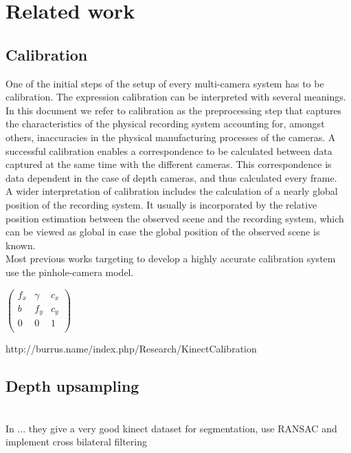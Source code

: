 \documentclass{ucl_thesis}
\begin{document}
\chapter{Related work} 
\label{chp:related_work}

\section{Calibration}
\label{sec:lit_calib}

One of the initial steps of the setup of every multi-camera system has to be calibration. The expression calibration can be interpreted with several meanings. In this document we refer to calibration as the preprocessing step that captures the characteristics of the physical recording system accounting for, amongst others, inaccuracies in the physical manufacturing processes of the cameras. A successful calibration enables a correspondence to be calculated between data captured at the same time with the different cameras. This correspondence is data dependent in the case of depth cameras, and thus calculated every frame.\\
A wider interpretation of calibration includes the calculation of a nearly global position of the recording system. It usually is incorporated by the relative position estimation between the observed scene and the recording system, which can be viewed as global in case the global position of the observed scene is known. \\

Most previous works targeting to develop a highly accurate calibration system use the pinhole-camera model. 
\citep{Zhang00}

$\left(\begin{array}{ccc}
		f_x & \gamma & c_x \\
		b & f_y & c_y \\
 		0 & 0 & 1 \\
	    \end{array} \right)$

http://burrus.name/index.php/Research/KinectCalibration


\section{Depth upsampling}
\citep{MatsuoFI13} \\

In \citep{Silberman:ECCV12} ... they give a very good kinect dataset for segmentation, use RANSAC and implement cross bilateral filtering
\end{document}
